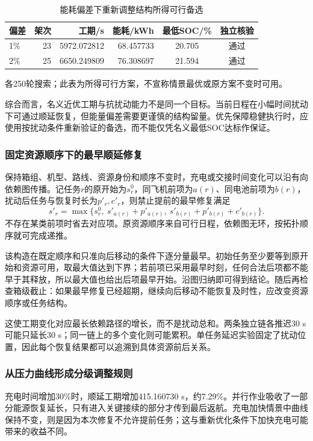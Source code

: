 \documentclass[withoutpreface,colorprint]{format}
\numberwithin{equation}{section}
\numberwithin{figure}{section}
\numberwithin{table}{section}
\begin{document}
\begin{table}[htbp]\centering\small
\caption{能耗偏差下重新调整结构所得可行备选}\label{tab:q2_energy_alternatives}
\begin{tabular}{@{}lrrrcc@{}}
\toprule
偏差 & 架次 & 工期/s & 能耗/kWh & 最低SOC/\% & 独立核验\\
\midrule
1\% & 23 & 5972.072812 & 68.457733 & 20.705 & 通过\\
2\% & 25 & 6650.249809 & 76.308697 & 21.594 & 通过\\
\bottomrule
\end{tabular}
\par\smallskip\parbox{.96\linewidth}{\footnotesize 各250轮搜索；此表为所得可行方案，不宣称情景最优或原方案不变时可用。}
\end{table}


综合而言，名义近优工期与抗扰动能力不是同一个目标。当前日程在小幅时间扰动下可通过顺延恢复，但能量偏差需要更谨慎的结构留量。优先保障稳健执行时，应使用按扰动条件重新验证的备选，而不能仅凭名义最低SOC达标作保证。


\subsubsection{固定资源顺序下的最早顺延修复}
保持箱组、机型、路线、资源身份和顺序不变时，充电或交接时间变化可以沿有向依赖图传播。记任务$r$的原开始为$s_r^0$，同飞机前项为$a(r)$、同电池前项为$b(r)$，扰动后任务与恢复时长为$p'_r,c'_r$，则禁止提前的最早修复满足
\begin{equation}
 s'_r=\max\{s_r^0,\ s'_{a(r)}+p'_{a(r)},\ s'_{b(r)}+p'_{b(r)}+c'_{b(r)}\}.
 \label{eq:q2_maxplus_repair}
\end{equation}
不存在某类前项时省去对应项。原资源顺序来自可行日程，依赖图无环，按拓扑顺序就可完成递推。

该构造在既定顺序和只准向后移动的条件下逐分量最早。初始任务至少要等到原开始和资源可用，取最大值达到下界；若前项已采用最早时刻，任何合法后项都不能早于其释放，所以最大值也给出后项最早开始。沿图归纳即可得到结论。随后再检查箱级截止：如果最早修复已经超期，继续向后移动不能恢复及时性，应改变资源顺序或任务结构。

这使工期变化对应最长依赖路径的增长，而不是扰动总和。两条独立链各推迟30 s可能只延长30 s；同一链上的多个变化则可能累积。单任务延迟实验固定了扰动位置，因此每个恢复结果都可以追溯到具体资源前后关系。

\subsubsection{从压力曲线形成分级调整规则}
充电时间增加30\%时，顺延工期增加415.160730 s，约7.29\%。并行作业吸收了一部分能源恢复延长，只有进入关键接续的部分才传到最后返航。充电加快情景中曲线保持不变，则是因为本次修复不允许提前任务；这与重新优化条件下加快充电可能带来的收益不同。
\end{document}
